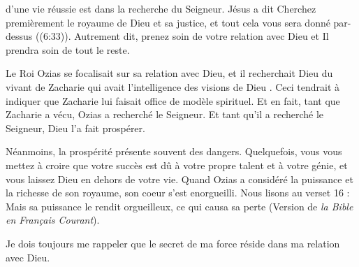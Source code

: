 



 d'une vie réussie est dans la recherche du Seigneur.
 Jésus a dit \og Cherchez premièrement le royaume de Dieu et sa justice,
 et tout cela vous sera donné par-dessus \fg{} ((6:33)).
 Autrement dit, prenez soin de votre relation avec Dieu et Il prendra soin
 de tout le reste. 

Le Roi Ozias se focalisait sur sa relation avec Dieu,
 et \og il recherchait Dieu du vivant de Zacharie qui avait l'intelligence
 des visions de Dieu \fg.
 Ceci tendrait à indiquer que Zacharie lui faisait office de modèle spirituel.
 Et en fait, tant que Zacharie a vécu, Ozias a recherché le Seigneur.
 Et tant qu'il a recherché le Seigneur, Dieu l'a fait prospérer.


Néanmoins, la prospérité présente souvent des dangers.
 Quelquefois, vous vous mettez à croire que votre succès est dû à votre propre
 talent et à votre génie, et vous laissez Dieu en dehors de votre vie.
 Quand Ozias a considéré la puissance et la richesse de son royaume,
 son coeur s'est enorgueilli.
 Nous lisons au verset 16 : \og Mais sa puissance le rendit orgueilleux,
 ce qui causa sa perte \fg{} (Version de \emph{la Bible en Français Courant}).

Je dois toujours me rappeler que le secret de ma force réside
 dans ma relation avec Dieu. 

\dvrule







